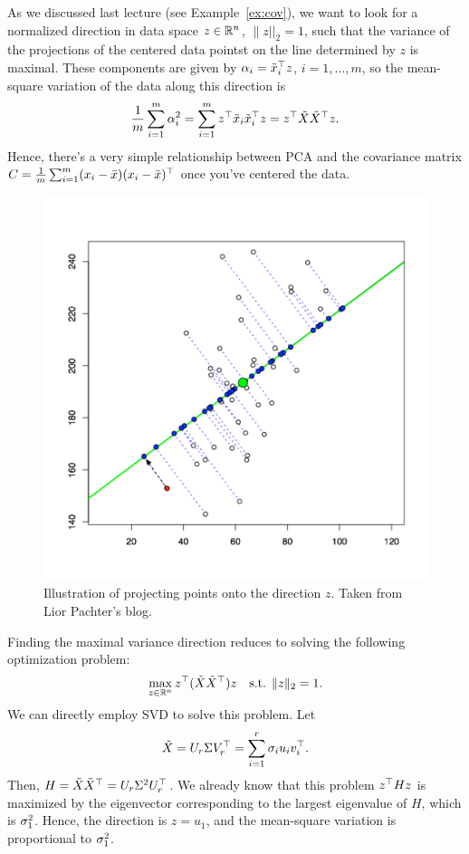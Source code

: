 \documentclass[11 pt]{scrartcl}
\newcommand{\tx}{\tilde{x}}
\begin{document}
As we discussed last lecture (see Example~\ref{ex:cov}), we want to look for a normalized direction in data space $z\in \mathbb R^n$, $\|z||_2 = 1$, such that the variance of the projections of the centered data pointst on the line determined by $z$ is maximal. 
These components are given by $\alpha_i = \tx_i^\T z$, $i=1,\dots, m$, so the mean-square variation of the data along this direction is 
\[ \frac{1}{m} \sum_{i=1}^m \alpha_i^2 = \sum_{i=1}^m z^\T \tx_i \tx_i^\T z = z^\T \tilde{X} \tilde{X}^\T z.\] 
Hence, there's a very simple relationship between PCA and the covariance matrix $C = \frac 1m \sum_{i=1}^m (x_i-\bar{x})(x_i-\bar{x})^\top$ once you've centered the data. 

\begin{figure}[!htb]
    \centering
    \includegraphics[scale = 0.3]{pca.jpg}
    \caption{Illustration of projecting points onto the direction $z$. Taken from Lior Pachter's blog.}
\end{figure}

Finding the maximal variance direction reduces to solving the following optimization problem: 
\[ \max_{z\in \mathbb R^n} z^\top (\tilde{X} \tilde{X}^\top) z \quad \text{s.t. } \|z\|_2 = 1.\] 
We can directly employ SVD to solve this problem. 
Let 
\[ \tilde{X} = U_r \Sigma V_r^\top = \sum_{i=1}^r \sigma_i u_i v_i^\top.\] 
Then, $H = \tilde{X}\tilde{X}^\top = U_r\Sigma^2 U_r^\top$. 
We already know that this problem $z^\top H z$ is maximized by the eigenvector corresponding to the largest eigenvalue of $H$, which is $\sigma_1^2$.
Hence, the direction is $z = u_1$, and the mean-square variation is proportional to $\sigma_1^2$. 
\end{document}

